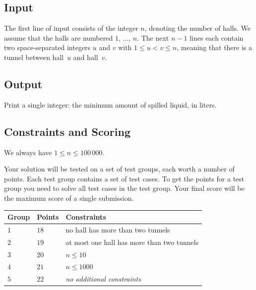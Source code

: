 \subsection*{Input}

The first line of input consists of the integer $n$, denoting the number of halls.
We assume that the halls are numbered $1$, $\ldots$, $n$.
The next $n-1$ lines each contain two space-separated integers $u$ and $v$ with 
$1\leq u < v \leq n$, %
meaning that there is a tunnel between hall~$u$ and hall~$v$.

\subsection*{Output}

Print a single integer: the minimum amount of spilled liquid, in liters.

\subsection*{Constraints and Scoring}

We always have
$1\leq n\leq 100\,000$. %

Your solution will be tested on a set of test groups, each worth a number of points.
Each test group contains a set of test cases.
To get the points for a test group you need to solve all test cases in the test group.
Your final score will be the maximum score of a single submission.

\medskip
\begin{tabular}{lll}
Group & Points & Constraints \\\hline
  $1$ & $18$ & no hall has more than two tunnels\\
  $2$ & $19$ & at most one hall has more than two tunnels\\
  $3$ & $20$ & $n\leq 10$\\
  $4$ & $21$ & $n\leq 1000$\\
  $5$ & $22$ & \emph{no additional constraints}
\end{tabular}
